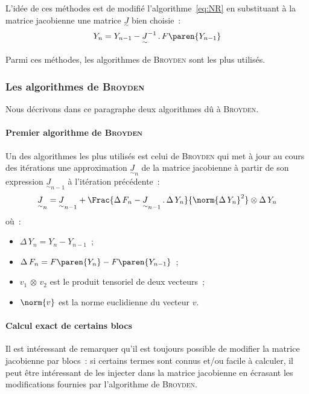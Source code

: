 \documentclass[rectoverso,pleiades,pstricks,leqno,anti]{texmf/note_technique_2010}
\begin{document}
L'idée de ces méthodes est de modifié l'algorithme~\eqref{eq:NR} en
substituant à la matrice jacobienne une matrice
\(\underset{\sim}{J}\) bien choisie~:
\begin{equation}
  \label{eq:QNR}
  Y_{n}=Y_{n-1}-\underset{\sim}{J}^{-1}\,.\,F\paren{Y_{n-1}}
\end{equation}

Parmi ces méthodes, les algorithmes de \textsc{Broyden} sont les plus utilisés.

\subsubsection{Les algorithmes de \textsc{Broyden}}

Nous décrivons dans ce paragraphe deux algorithmes dû à \textsc{Broyden}.

\paragraph{Premier algorithme de \textsc{Broyden}} Un des algorithmes
les plus utilisés est celui de \textsc{Broyden} qui met à jour au cours
des itérations une approximation \(\underset{\sim}{J}_{n}\) de la
matrice jacobienne à partir de son expression
\(\underset{\sim}{J}_{n-1}\) à l'itération précédente~:
\begin{equation}
  \label{eq:Broyden} \underset{\sim}{J}_{n} =
  \underset{\sim}{J}_{n-1}+\Frac{\Delta\,F_{n}-\underset{\sim}{J}_{n-1}\,.\,\Delta\,Y_{n}}{\norm{\Delta\,Y_{n}}^{2}}\otimes\Delta\,Y_{n}
\end{equation}
où~:
\begin{minipage}[t]{0.8\linewidth}
  \begin{itemize}
    \item \(\Delta\,Y_{n}=Y_{n}-Y_{n-1}\)~;
    \item
    \(\Delta\,F_{n}=F\paren{Y_{n}}-F\paren{Y_{n-1}}\)~;
    \item \(v_{1}\,\otimes\,v_{2}\) est le produit tensoriel de deux
    vecteurs~;
    \item \(\norm{v}\) est la norme euclidienne du vecteur \(v\).
  \end{itemize}
\end{minipage}

\paragraph{Calcul exact de certains blocs}
Il est intéressant de remarquer qu'il est toujours possible de modifier
la matrice jacobienne par blocs~: si certains termes sont connus et/ou
facile à calculer, il peut être intéressant de les injecter dans la
matrice jacobienne en écrasant les modifications fournies par
l'algorithme de \textsc{Broyden}.
\end{document}
